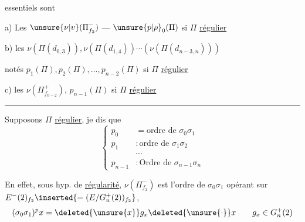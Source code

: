 essentiels sont

a) Les $\unsure{\nu|v}(\Pi^-_{f_2})$ ---  $\unsure{p|\rho}_0(\Pi)$ si $\Pi$ \uline{régulier}

b) les $\nu(\Pi(d_{0,3})),\nu(\Pi(d_{1,4}))\cdots(\nu(\Pi(d_{n-3,n})))$

notés $p_1(\Pi),p_2(\Pi),\ldots,p_{n-2}(\Pi)$ si $\Pi$ \uline{régulier}

c) les $\nu(\Pi^+_{f_{n-2}})$,  $p_{n-1}(\Pi)$ si $\Pi$ \uline{régulier}

\par\noindent\hspace*{.25\linewidth}\rule{.25\linewidth}{.4pt}\par

Supposons $\Pi$ \uline{régulier}, je dis que
\[
\left\{\begin{aligned}
p_0&=\text{ordre de }\sigma_0\sigma_1\\
p_1&:\text{ordre de }\sigma_1\sigma_2\\
&\cdots\\
p_{n-1}&:\text{Ordre de }\sigma_{n-1}\sigma_n
\end{aligned}\right.
\]

En effet, \deleted{\unsure{$\Pi$}} sous hyp. de \uline{régularité}, $\nu(\Pi^-_{f_2})$ est l'ordre de $\sigma_0\sigma_1$ opérant sur $E^-(2)_{f_2}\inserted{=(E/G_n^+(2))_{f_2}}$, 
\[
(\sigma_0\sigma_1)^p x=\deleted{\unsure{x}}g_x\deleted{\unsure{\cdot}}x\qquad g_x\in G_n^+(2)
\]
